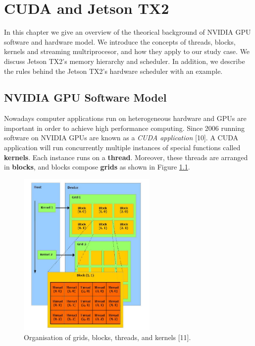 \documentclass[
  12pt,
  a4paperpaper,
]{report}
\begin{document}
\hypertarget{cuda-and-jetson-tx2}{%
\chapter{CUDA and Jetson TX2}\label{cuda-and-jetson-tx2}}

In this chapter we give an overview of the theorical background of
NVIDIA GPU software and hardware model. We introduce the concepts of
threads, blocks, kernels and streaming multriprocesor, and how they
apply to our study case. We discuss Jetson TX2's memory hierarchy
and scheduler. In addition, we describe the rules behind the Jetson
TX2's hardware scheduler with an example.

\hypertarget{nvidia-gpu-software-model}{%
\section{NVIDIA GPU Software Model}\label{nvidia-gpu-software-model}}

Nowadays computer applications run on heterogeneous hardware and GPUs
are important in order to achieve high performance computing. Since 2006
running software on NVIDIA GPUs are known as a \emph{CUDA application}
{[}10{]}. A CUDA application will run concurrently multiple instances of
special functions called \textbf{kernels}. Each instance runs on a
\textbf{thread}. Moreover, these threads are arranged in
\textbf{blocks}, and blocks compose \textbf{grids} as shown in Figure
\ref{img:sw_model_grids}.

\begin{figure}
\centering
\includegraphics[width=0.6\textwidth,height=\textheight]{source/figures/sw_model_grids.png}
\caption{Organisation of grids, blocks, threads, and kernels {[}11{]}.
\label{img:sw_model_grids}}
\end{figure}
\end{document}
